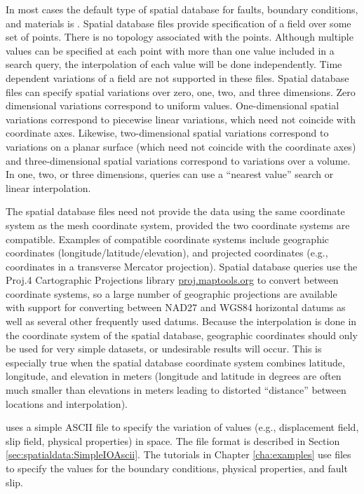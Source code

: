 In most cases the default type of spatial database for faults, boundary
conditions, and materials is . Spatial database files
provide specification of a field over some set of points. There is
no topology associated with the points. Although multiple values can
be specified at each point with more than one value included in a
search query, the interpolation of each value will be done independently.
Time dependent variations of a field are not supported in these files.
Spatial database files can specify spatial variations over zero, one,
two, and three dimensions. Zero dimensional variations correspond
to uniform values. One-dimensional spatial variations correspond to
piecewise linear variations, which need not coincide with coordinate
axes. Likewise, two-dimensional spatial variations correspond to variations
on a planar surface (which need not coincide with the coordinate axes)
and three-dimensional spatial variations correspond to variations
over a volume. In one, two, or three dimensions, queries can use a
``nearest value'' search or linear interpolation.

The spatial database files need not provide the data using the same
coordinate system as the mesh coordinate system, provided the two
coordinate systems are compatible. Examples of compatible coordinate
systems include geographic coordinates (longitude/latitude/elevation),
and projected coordinates (e.g., coordinates in a transverse Mercator
projection). Spatial database queries use the Proj.4 Cartographic
Projections library \url{proj.maptools.org} to convert between coordinate
systems, so a large number of geographic projections are available
with support for converting between NAD27 and WGS84 horizontal datums
as well as several other frequently used datums. Because the interpolation
is done in the coordinate system of the spatial database, geographic
coordinates should only be used for very simple datasets, or undesirable
results will occur. This is especially true when the spatial database
coordinate system combines latitude, longitude, and elevation in meters
(longitude and latitude in degrees are often much smaller than elevations
in meters leading to distorted ``distance'' between locations and
interpolation).

 uses a simple ASCII file to specify the variation of values (e.g., displacement field, slip field, physical properties) in space.  The file format is described in Section \vref{sec:spatialdata:SimpleIOAscii}.  The tutorials in Chapter \vref{cha:examples} use  files to specify the values for the boundary conditions, physical properties, and fault slip.

